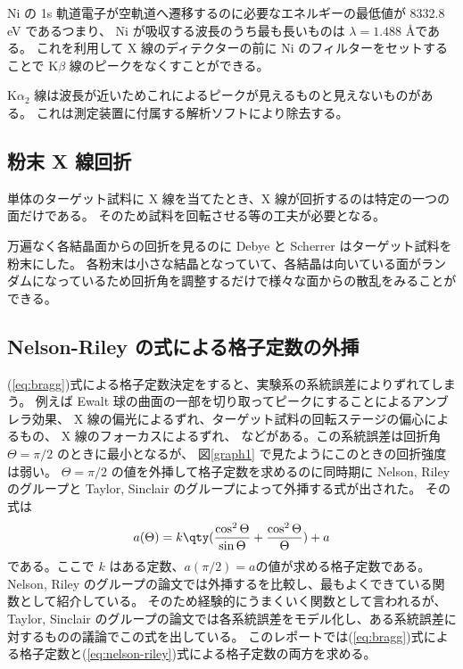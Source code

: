 \documentclass[11pt,dvipdfmx,a4paper]{jsarticle}
\begin{document}
Ni の 1s 軌道電子が空軌道へ遷移するのに必要なエネルギーの最低値が 8332.8 eV であるつまり、
Ni が吸収する波長のうち最も長いものは \(\lambda = 1.488\) \AA である。
これを利用して X 線のディテクターの前に Ni のフィルターをセットすることで K\(\beta\) 線のピークをなくすことができる。

K\(\alpha_2\) 線は波長が近いためこれによるピークが見えるものと見えないものがある。
これは測定装置に付属する解析ソフトにより除去する。

\subsection{粉末 X 線回折}
単体のターゲット試料に X 線を当てたとき、X 線が回折するのは特定の一つの面だけである。
そのため試料を回転させる等の工夫が必要となる。

万遍なく各結晶面からの回折を見るのに Debye と Scherrer はターゲット試料を粉末にした。
各粉末は小さな結晶となっていて、各結晶は向いている面がランダムになっているため回折角を調整するだけで様々な面からの散乱をみることができる。


\subsection{Nelson-Riley の式による格子定数の外挿}
(\ref{eq:bragg})式による格子定数決定をすると、実験系の系統誤差によりずれてしまう。
例えば Ewalt 球の曲面の一部を切り取ってピークにすることによるアンブレラ効果、
X 線の偏光によるずれ、ターゲット試料の回転ステージの偏心によるもの、
X 線のフォーカスによるずれ、
などがある。この系統誤差は回折角 \(\Theta = \pi/2\) のときに最小となるが、
図\ref{graph1} で見たようにこのときの回折強度は弱い。
\(\Theta = \pi/2\) の値を外挿して格子定数を求めるのに同時期に Nelson, Riley のグループと
Taylor, Sinclair のグループによって外挿する式が出された。\cite{Nelson_1945}\cite{Taylor_1945}
その式は
\begin{align}
	a(\Theta) = k\qty(\frac{\cos^2\Theta}{\sin\Theta}+\frac{\cos^2\Theta}{\Theta}) + a \label{eq:nelson-riley}
\end{align}
である。ここで \(k\) はある定数、\(a(\pi/2)=a\)の値が求める格子定数である。
Nelson, Riley のグループの論文では外挿するを比較し、最もよくできている関数として紹介している。
そのため経験的にうまくいく関数として言われるが、
Taylor, Sinclair のグループの論文では各系統誤差をモデル化し、ある系統誤差に対するものの議論でこの式を出している。
このレポートでは(\ref{eq:bragg})式による格子定数と(\ref{eq:nelson-riley})式による格子定数の両方を求める。
\end{document}
